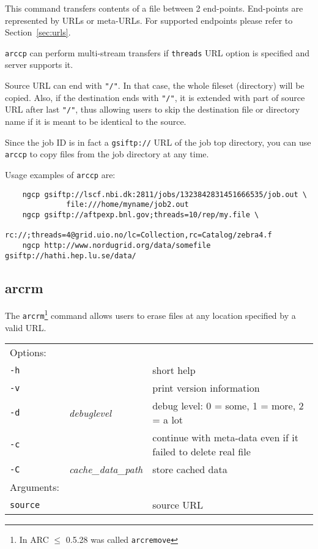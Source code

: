 This command transfers contents of a file between 2 end-points.
End-points are represented by URLs or meta-URLs. For supported
endpoints please refer to Section~\ref{sec:urls}.

\texttt{arccp} can perform multi-stream transfers if \texttt{threads}
URL option is specified and server supports it.

Source URL can end with \verb#"/"#. In that case, the whole fileset
(directory) will be copied. Also, if the destination ends with
\verb#"/"#, it is extended with part of source URL after last
\verb#"/"#, thus allowing users to skip the destination file or
directory name if it is meant to be identical to the source.

\begin{framed}
   Since the job ID is in fact a \verb#gsiftp://# URL of the job
   top directory, you can use \texttt{arccp} to copy files from the
   job directory at any time.
\end{framed}

Usage examples of \texttt{arccp} are:

\begin{verbatim}
    ngcp gsiftp://lscf.nbi.dk:2811/jobs/1323842831451666535/job.out \
              file:///home/myname/job2.out
    ngcp gsiftp://aftpexp.bnl.gov;threads=10/rep/my.file \
              rc://;threads=4@grid.uio.no/lc=Collection,rc=Catalog/zebra4.f
    ngcp http://www.nordugrid.org/data/somefile gsiftp://hathi.hep.lu.se/data/
\end{verbatim}

\subsection{arcrm}\label{sec:arcrm}

The \texttt{arcrm}\footnote{In ARC $\leq$ 0.5.28 was called
  \texttt{arcremove}} 
command allows users to erase files at any location specified by a
valid URL.
\hspace*{0.5cm}
\begin{shaded}
\end{shaded}
\begin{longtable}{llp{8cm}}
    Options:&&\\
    \texttt{-h} && short help\\
    \texttt{-v} && print version information\\
    \texttt{-d} & \textit{debuglevel} &debug level: 0 = some, 1 = more, 2 = a lot \\
    \texttt{-c} & &continue with meta-data even if it failed to delete real file\\
    \texttt{-C} & \textit{cache\_data\_path} & store cached data\\
    Arguments:&&\\
    \texttt{source} && source URL\\
\end{longtable}

